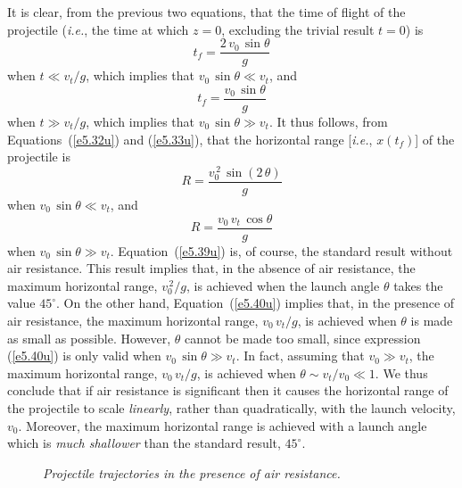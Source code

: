 It is clear, from the previous two equations, that the time
of flight of the projectile ({\em i.e.}, the time at which $z=0$, excluding the
trivial result $t=0$) is
\begin{equation}
t_f = \frac{2\,v_0\,\sin\theta}{g}
\end{equation}
when $t\ll v_t/g$, which implies that $v_0\,\sin\theta \ll v_t$,
and
\begin{equation}
t_f = \frac{v_0\,\sin\theta}{g}
\end{equation}
when  $t\gg v_t/g$, which implies that $v_0\,\sin\theta \gg v_t$.
It thus follows, from Equations~(\ref{e5.32u}) and (\ref{e5.33u}), that
the horizontal range [{\em i.e.}, $x(t_f)$] of the projectile
is 
\begin{equation}\label{e5.39u}
R = \frac{v_0^{\,2}\,\sin(2\,\theta)}{g}
\end{equation}
when $v_0\,\sin\theta \ll v_t$, and
\begin{equation}\label{e5.40u}
R= \frac{v_0\,v_t\,\cos\theta}{g}
\end{equation}
when $v_0\,\sin\theta \gg v_t$.
Equation~(\ref{e5.39u}) is, of course, the standard result without
air resistance. This result implies that, in the absence of air resistance, the maximum horizontal range, $v_0^{\,2}/g$,
is achieved when the launch angle $\theta$ takes the value $45^\circ$.
On the other hand, Equation~(\ref{e5.40u}) implies that, in the presence of
air resistance, the maximum horizontal
range, $v_0\,v_t/g$, is achieved when $\theta$ is made as small
as possible. However, $\theta$ cannot be made too small, since
expression (\ref{e5.40u}) is only valid when $v_0\,\sin\theta \gg v_t$.
In fact, assuming  that $v_0\gg v_t$,  the maximum horizontal
range, $v_0\,v_t/g$, is achieved when $\theta\sim v_t/v_0\ll 1$. We thus
conclude that if air resistance is significant then it causes the horizontal range of the
projectile to scale {\em linearly}, rather than quadratically, with the
launch velocity, $v_0$. Moreover, the maximum horizontal  range is achieved
with a launch angle which is {\em much shallower}\/ than the standard
result, $45^\circ$. 

\begin{figure}[h]
\epsfysize=3in
\centerline{}
\caption{\em Projectile trajectories in the presence of air resistance.}\label{fdrag}
\end{figure}

